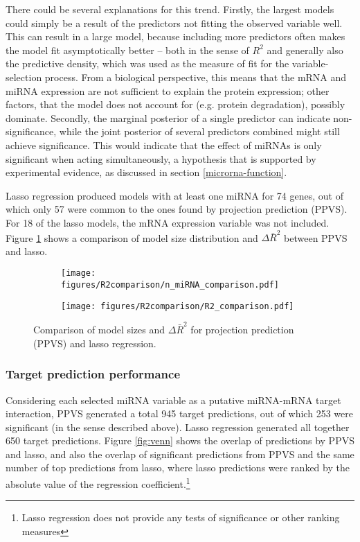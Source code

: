 There could be several explanations for this trend. Firstly, the largest
models could simply be a result of the predictors not fitting the observed
variable well. This can result in a large model, because including more
predictors often makes the model fit asymptotically better -- both in the
sense of $R^2$ and generally also the predictive density, which was used as
the measure of fit for the variable-selection process. From a biological
perspective, this means that the mRNA and miRNA expression are not sufficient
to explain the protein expression; other factors, that the model does not
account for (e.g. protein degradation), possibly dominate.
Secondly, the marginal posterior of a single predictor can indicate
non-significance, while the joint posterior of several predictors combined
might still achieve significance. This would indicate that the effect of
miRNAs is only significant when acting simultaneously, a hypothesis that is
supported by experimental evidence, as discussed in section
\ref{microrna-function}.

Lasso regression produced models with at least one miRNA for 74 genes, out of
which only 57 were common to the ones found by projection prediction (PPVS).
For 18 of the lasso models, the mRNA expression variable was not included.
Figure \ref{fig:model-size} shows a comparison of model size distribution
and $\Delta\bar{R}^2$ between PPVS and lasso.

\begin{figure}[!h]
  \centering
  \begin{subfigure}{.45\textwidth}
    \centering
    \texttt{[image: figures/R2comparison/n\_miRNA\_comparison.pdf]}
  \end{subfigure}
  \begin{subfigure}{.45\textwidth}
    \centering
    \texttt{[image: figures/R2comparison/R2\_comparison.pdf]}
  \end{subfigure}

  \caption{Comparison of model sizes and $\Delta\bar{R}^2$ for
      projection prediction (PPVS) and lasso regression.}
  \label{fig:model-size}
\end{figure}




\subsubsection{Target prediction performance}

Considering each selected miRNA variable as a putative miRNA-mRNA target
interaction, PPVS generated a total 945 target predictions, out of which
253 were significant (in the sense described above).
Lasso regression generated all together 650 target predictions. Figure
\ref{fig:venn} shows the overlap of predictions by PPVS and lasso, and also
the overlap of significant predictions from PPVS and the same number of top
predictions from lasso, where lasso predictions were ranked by the absolute value of
the regression coefficient.\footnote{Lasso regression does not provide any tests of
significance or other ranking measures}

